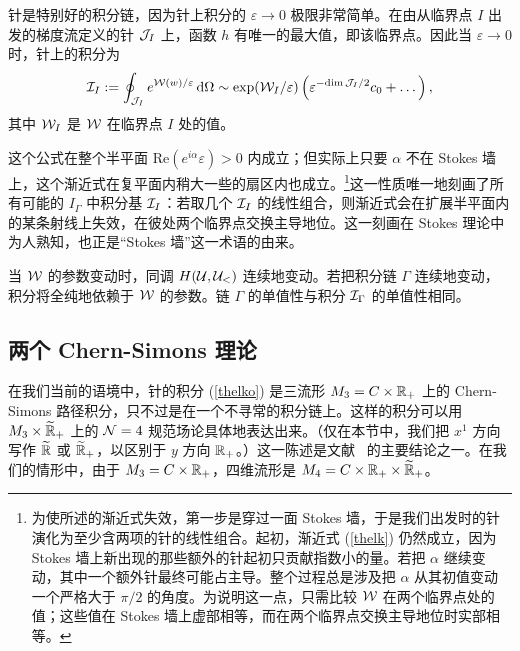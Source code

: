 针是特别好的积分链，因为针上积分的 $\varepsilon\to 0$ 极限非常简单。在由从临界点 $I$ 出发的梯度流定义的针 ${\mathcal J}_I$ 上，函数 $h$ 有唯一的最大值，即该临界点。因此当 $\varepsilon\to 0$ 时，针上的积分为
\begin{equation}\label{thelk}
{\mathcal I}_I:= \oint_{{\mathcal J}_I} e^{ {\mathcal W}(w)/\varepsilon}\, {\mathrm d} \Omega\sim \exp({\mathcal W}_I/\varepsilon)\left(\varepsilon^{-\mathrm{dim}\,{\mathcal J}_I/2}c_0+\dots\right),
\end{equation}
其中 ${\mathcal W}_I$ 是 ${\mathcal W}$ 在临界点 $I$ 处的值。

这个公式在整个半平面 $\mathrm{Re} \left( e^{i \alpha} \varepsilon\right)>0$ 内成立；但实际上只要 $\alpha$ 不在 Stokes 墙上，这个渐近式在复平面内稍大一些的扇区内也成立。\footnote{\label{breakdown}为使所述的渐近式失效，第一步是穿过一面 Stokes 墙，于是我们出发时的针演化为至少含两项的针的线性组合。起初，渐近式 (\ref{thelk}) 仍然成立，因为 Stokes 墙上新出现的那些额外的针起初只贡献指数小的量。若把 $\alpha$ 继续变动，其中一个额外针最终可能占主导。整个过程总是涉及把 $\alpha$ 从其初值变动一个严格大于 $\pi/2$ 的角度。为说明这一点，只需比较 ${\mathcal W}$ 在两个临界点处的值；这些值在 Stokes 墙上虚部相等，而在两个临界点交换主导地位时实部相等。}这一性质唯一地刻画了所有可能的 $I_\Gamma$ 中积分基 ${\mathcal I}_I$：若取几个 ${\mathcal I}_I$ 的线性组合，则渐近式会在扩展半平面内的某条射线上失效，在彼处两个临界点交换主导地位。这一刻画在 Stokes 理论中为人熟知，也正是“Stokes 墙”这一术语的由来。

当 ${\mathcal W}$ 的参数变动时，同调 $H({\mathcal U},{\mathcal U}_<)$ 连续地变动。若把积分链 $\Gamma$ 连续地变动，积分将全纯地依赖于 ${\mathcal W}$ 的参数。链 $\Gamma$ 的单值性与积分 ${\mathcal I}_\Gamma$ 的单值性相同。

\subsection{两个 Chern-Simons 理论}
在我们当前的语境中，针的积分 (\ref{thelko}) 是三流形 $M_3 = C \times {\mathbb R}_+$ 上的 Chern-Simons 路径积分，只不过是在一个不寻常的积分链上。这样的积分可以用 $M_3 \times \widetilde {{\mathbb R}}_+$ 上的 ${\mathcal N}=4$ 规范场论具体地表达出来。（仅在本节中，我们把 $x^1$ 方向写作 $\widetilde {{\mathbb R}}$ 或 $\widetilde{{\mathbb R}}_+$，以区别于 $y$ 方向 ${\mathbb R}_+$。）这一陈述是文献~\cite{Analytic, NewLook} 的主要结论之一。在我们的情形中，由于 $M_3 = C \times {\mathbb R}_+$，四维流形是 $M_4 = C \times {\mathbb R}_+ \times \widetilde {{\mathbb R}}_+$。

